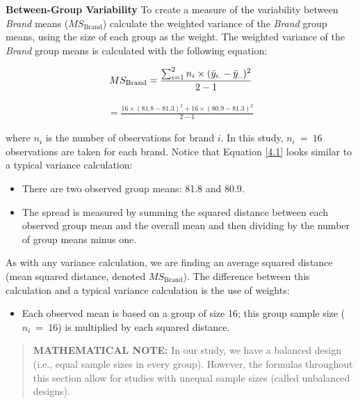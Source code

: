 \documentclass[
]{report}
\providecommand{\tightlist}{%
  \setlength{\itemsep}{0pt}\setlength{\parskip}{0pt}}
\begin{document}
\textbf{Between-Group Variability} To create a measure of the variability between \emph{Brand} means (\(\scriptstyle MS_{\text{Brand}}\)) calculate the weighted variance of the \emph{Brand} group means, using the size of each group as the weight. The weighted variance of the \emph{Brand} group means is calculated with the following equation:

\begin{align}
MS_{\text{Brand}} = \frac{\sum_{i=1}^{2} n_i \times (\bar{y}_{i.} - \bar{y}_{..})^2}{2-1}
\notag
\end{align}

\begin{align}\label{4.1}
= \frac{16 \times (81.8 - 81.3)^2 + 16 \times (80.9 - 81.3)^2}{2-1}
\tag{4.1}
\end{align}

where \(\scriptstyle n_i\) is the number of observations for brand \(\scriptstyle i\). In this study, \(\scriptstyle n_i \ =\  16\) observations are taken for each brand. Notice that Equation \ref{4.1} looks similar to a typical variance calculation:

\begin{itemize}
\tightlist
\item
  There are two observed group means: 81.8 and 80.9.
\item
  The spread is measured by summing the squared distance between each observed group mean and the overall mean and then dividing by the number of group means minus one.
\end{itemize}

As with any variance calculation, we are finding an average squared distance (mean squared distance, denoted \(\scriptstyle MS_{\text{Brand}}\)). The difference between this calculation and a typical variance calculation is the use of weights:

\begin{itemize}
\tightlist
\item
  Each observed mean is based on a group of size 16; this group sample size (\(\scriptstyle n_i \ =\  16\)) is multiplied by each squared distance.
\end{itemize}

\begin{quote}
\textbf{MATHEMATICAL NOTE:} In our study, we have a balanced design (i.e., equal sample sizes in every group). However, the formulas throughout this section allow for studies with unequal sample sizes (called unbalanced designs).
\end{quote}
\end{document}
